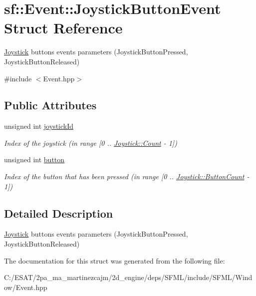 \hypertarget{structsf_1_1_event_1_1_joystick_button_event}{}\section{sf\+:\+:Event\+:\+:Joystick\+Button\+Event Struct Reference}
\label{structsf_1_1_event_1_1_joystick_button_event}


\hyperlink{classsf_1_1_joystick}{Joystick} buttons events parameters (Joystick\+Button\+Pressed, Joystick\+Button\+Released)  




{\ttfamily \#include $<$Event.\+hpp$>$}

\subsection*{Public Attributes}
\begin{DoxyCompactItemize}
\item 
\mbox{\label{structsf_1_1_event_1_1_joystick_button_event_a2f80ecdb964a5ae0fc30726a404c41ec}} 
unsigned int \hyperlink{structsf_1_1_event_1_1_joystick_button_event_a2f80ecdb964a5ae0fc30726a404c41ec}{joystick\+Id}
\begin{DoxyCompactList}\small\item\em Index of the joystick (in range \mbox{[}0 .. \hyperlink{classsf_1_1_joystick_a21be587f472619c1230b6aa746ce0c79a6e0a2a95bc1da277610c04d80f52715e}{Joystick\+::\+Count} -\/ 1\mbox{]}) \end{DoxyCompactList}\item 
\mbox{\label{structsf_1_1_event_1_1_joystick_button_event_a6412e698a2f7904c5aa875a0d1b34da4}} 
unsigned int \hyperlink{structsf_1_1_event_1_1_joystick_button_event_a6412e698a2f7904c5aa875a0d1b34da4}{button}
\begin{DoxyCompactList}\small\item\em Index of the button that has been pressed (in range \mbox{[}0 .. \hyperlink{classsf_1_1_joystick_a21be587f472619c1230b6aa746ce0c79a2f1b8a0a59f2c12a4775c0e1e69e1816}{Joystick\+::\+Button\+Count} -\/ 1\mbox{]}) \end{DoxyCompactList}\end{DoxyCompactItemize}


\subsection{Detailed Description}
\hyperlink{classsf_1_1_joystick}{Joystick} buttons events parameters (Joystick\+Button\+Pressed, Joystick\+Button\+Released) 

The documentation for this struct was generated from the following file\+:\begin{DoxyCompactItemize}
\item 
C\+:/\+E\+S\+A\+T/2pa\+\_\+ma\+\_\+martinezcajm/2d\+\_\+engine/deps/\+S\+F\+M\+L/include/\+S\+F\+M\+L/\+Window/Event.\+hpp\end{DoxyCompactItemize}
